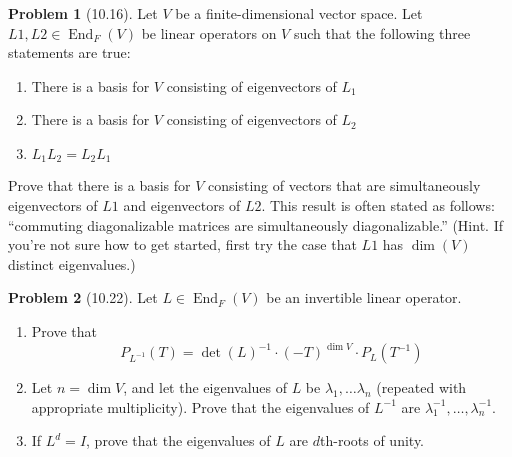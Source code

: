 \documentclass[12pt]{article}
\theoremstyle{definition}
\newtheorem{problem}{Problem}
\DeclareMathOperator{\End}{End}
\begin{document}
\begin{problem}[10.16]
    Let $V$ be a finite-dimensional vector space. Let $L1, L2 \in \End_F{(V)}$ be linear operators on $V$ such that the following three statements are true: 
    \begin{enumerate}[label=(\arabic*)]
        \item There is a basis for $V$ consisting of eigenvectors of $L_1$
        \begin{solution}

        \end{solution}

        \item There is a basis for $V$ consisting of eigenvectors of $L_2$
        \begin{solution}

        \end{solution}

        \item $L_1L_2 = L_2L_1$
        \begin{solution}

        \end{solution}
    \end{enumerate}
    Prove that there is a basis for $V$ consisting of vectors that are simultaneously eigenvectors of $L1$ and eigenvectors of $L2$. 
    This result is often stated as follows: “commuting diagonalizable matrices are simultaneously diagonalizable.” 
    (Hint. If you’re not sure how to get started, first try the case that $L1$ has $\dim(V)$ distinct eigenvalues.)
\end{problem}

\begin{problem}[10.22]
    Let $L \in \End_F{(V)}$ be an invertible linear operator.
    \begin{enumerate}[label=(\alph*)]
        \item Prove that
        \[
            P_{L^{-1}}(T) = \det(L)^{-1} \cdot (-T)^{\dim{V}} \cdot P_L(T^{-1})
        \]
        \begin{solution}

        \end{solution}

        \item Let $n = \dim{V}$, and let the eigenvalues of $L$ be $\lambda_1, \ldots \lambda_n$ (repeated with appropriate multiplicity).
        Prove that the eigenvalues of $L^{-1}$ are $\lambda_1^{-1}, \ldots , \lambda_n^{-1}$.
        \begin{solution}

        \end{solution}

        \item If $L^d = I$, prove that the eigenvalues of $L$ are $d$th-roots of unity.
        \begin{solution}

        \end{solution}
    \end{enumerate}
\end{problem}
\end{document}
